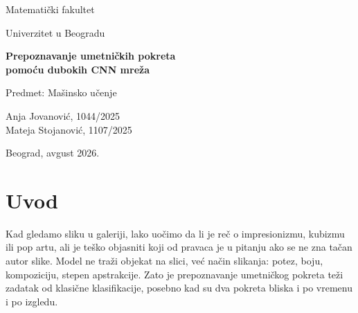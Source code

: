 \documentclass[12pt,a4paper]{article}
\begin{document}
\begin{titlepage}
  \centering
  \vspace*{1.5cm}
  {\Large Matematički fakultet\par}
  {\large Univerzitet u Beogradu\par}
  \vspace{2cm}
  {\huge\bfseries Prepoznavanje umetničkih pokreta\\pomoću dubokih CNN mreža\par}
  \vspace{1.5cm}
  {\large Predmet: Mašinsko učenje\par}
  \vspace{2.5cm}
  {\large
    Anja Jovanović, 1044/2025\\
    Mateja Stojanović, 1107/2025\par}
  \vfill
  {\large Beograd, avgust 2026.\par}
\end{titlepage}

\begin{abstract}
\noindent
Rad se bavi klasifikacijom slika umetničkih dela u jedan od 18 umetničkih pokreta na skupu Pandora 18K.
Testirali smo četiri modela: dve konvolucione mreže trenirane od nule (VGG-lite i hibrid sa Inception-stil granom)
i transfer learning sa InceptionV3, prvo sa novom dense glavom, a zatim sa fine-tuningom poslednjeg konvolucionog bloka.
Najbolji rezultat dao je fine-tune model: test accuracy 56{,}91\% i macro F1 0{,}570.
To je u skladu sa rezultatima iz literature za isti zadatak.
Custom modeli su ostali znatno ispod toga (VGG-lite 35{,}14\%, hibrid 27{,}72\%),
što pokazuje koliko pomaže prethodno učenje na ImageNet-u.

\medskip
\noindent\textbf{Ključne reči:} CNN, transfer learning, fine-tuning, klasifikacija slika, umetnički pokreti, Pandora 18K
\end{abstract}

\tableofcontents
\newpage

\section{Uvod}

Kad gledamo sliku u galeriji, lako uočimo da li je reč o impresionizmu, kubizmu ili pop artu,
ali je teško objasniti koji od pravaca je u pitanju ako se ne zna tačan autor slike.
Model ne traži objekat na slici, već način slikanja: potez, boju, kompoziciju, stepen apstrakcije.
Zato je prepoznavanje umetničkog pokreta teži zadatak od klasične klasifikacije,
posebno kad su dva pokreta bliska i po vremenu i po izgledu.
\end{document}
